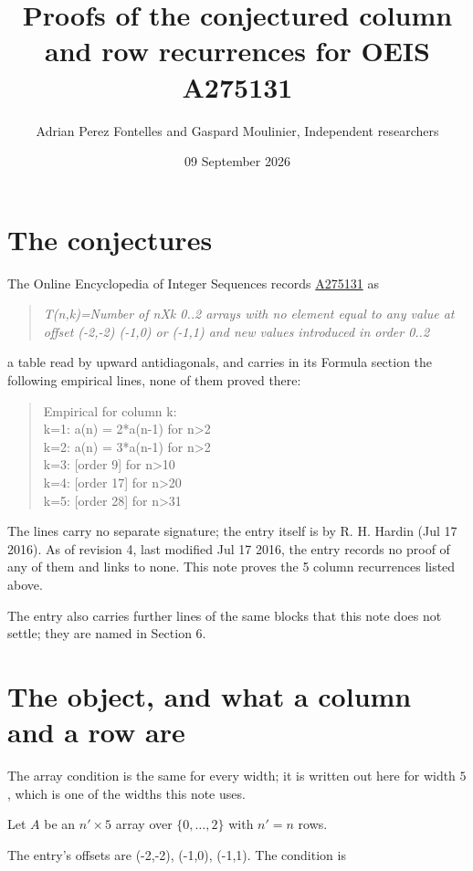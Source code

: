 \documentclass[11pt]{article}
\title{Proofs of the conjectured column and row recurrences for OEIS A275131}
\author{Adrian Perez Fontelles and Gaspard Moulinier, Independent researchers}
\date{09 September 2026}
\theoremstyle{definition}
\begin{document}
\maketitle
\section{The conjectures}

The Online Encyclopedia of Integer Sequences records \href{https://oeis.org/A275131}{A275131} as

\begin{quote}\itshape T(n,k)=Number of nXk 0..2 arrays with no element equal to any value at offset (-2,-2) (-1,0) or (-1,1) and new values introduced in order 0..2\end{quote}

a table read by upward antidiagonals, and carries in its Formula section the following empirical lines, none of them proved there:

\begin{quote}\ttfamily Empirical for column k:\\
k=1: a(n) = 2*a(n-1) for n>2\\k=2: a(n) = 3*a(n-1) for n>2\\k=3: [order 9] for n>10\\k=4: [order 17] for n>20\\k=5: [order 28] for n>31\end{quote}

The lines carry no separate signature; the entry itself is by R. H. Hardin (Jul 17 2016). As of revision 4, last modified Jul 17 2016, the entry records no proof of any of them and links to none. This note proves the 5 column recurrences listed above.

The entry also carries further lines of the same blocks that this note does not settle; they are named in Section 6.

\section{The object, and what a column and a row are}

The array condition is the same for every width; it is written out here for width $5$, which is one of the widths this note uses.

Let $A$ be an $n' \times 5$ array over $\{0,\dots,2\}$ with $n' = n$ rows.

The entry's offsets are (-2,-2), (-1,0), (-1,1). The condition is
\end{document}
